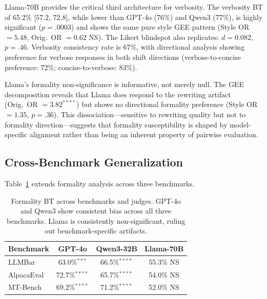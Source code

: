 \documentclass[11pt,a4paper]{article}
\begin{document}
Llama-70B provides the critical third architecture for verbosity. The verbosity BT of 65.2\% [$57.2$, $72.8$], while lower than GPT-4o (76\%) and Qwen3 (77\%), is highly significant ($p = .0003$) and shows the same pure style GEE pattern (Style OR $= 5.48$, Orig.\ OR $= 0.62$ NS). The Likert blindspot also replicates: $d = 0.082$, $p = .46$. Verbosity consistency rate is 67\%, with directional analysis showing preference for verbose responses in both shift directions (verbose-to-concise preference: 72\%; concise-to-verbose: 83\%).

Llama's formality non-significance is informative, not merely null. The GEE decomposition reveals that Llama does respond to the rewriting artifact (Orig.\ OR $= 3.82^{****}$) but shows no directional formality preference (Style OR $= 1.35$, $p = .36$). This dissociation---sensitive to rewriting quality but not to formality direction---suggests that formality susceptibility is shaped by model-specific alignment rather than being an inherent property of pairwise evaluation.

\subsection{Cross-Benchmark Generalization}
\label{sec:crossbench}

Table~\ref{tab:crossbench} extends formality analysis across three benchmarks.

\begin{table}[t]
\centering
\small
\caption{Formality BT across benchmarks and judges. GPT-4o and Qwen3 show consistent bias across all three benchmarks. Llama is consistently non-significant, ruling out benchmark-specific artifacts.}
\label{tab:crossbench}
\begin{tabular}{lccc}
\toprule
\textbf{Benchmark} & \textbf{GPT-4o} & \textbf{Qwen3-32B} & \textbf{Llama-70B} \\
\midrule
LLMBar    & 63.0\%$^{***}$  & 66.5\%$^{****}$ & 55.3\% NS \\
AlpacaEval & 72.7\%$^{****}$ & 65.7\%$^{****}$ & 54.0\% NS \\
MT-Bench  & 69.2\%$^{****}$ & 71.2\%$^{****}$ & 52.0\% NS \\
\bottomrule
\end{tabular}
\end{table}
\end{document}
